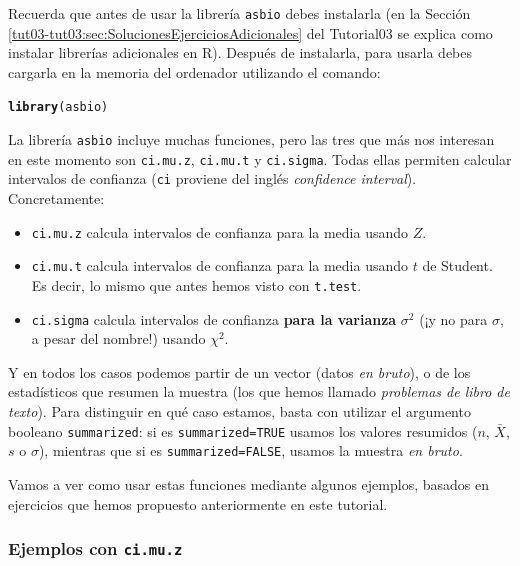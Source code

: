 \documentclass[10pt,a4paper]{article}\usepackage[]{graphicx}\usepackage[]{color}
\makeatletter
\newcommand{\hlstd}[1]{\textcolor[rgb]{0.345,0.345,0.345}{#1}}%
\newcommand{\hlkwd}[1]{\textcolor[rgb]{0.737,0.353,0.396}{\textbf{#1}}}%
\newenvironment{kframe}{%
 \def\at@end@of@kframe{}%
 \ifinner\ifhmode%
  \def\at@end@of@kframe{\end{minipage}}%
  \begin{minipage}{\columnwidth}%
 \fi\fi%
 \def\FrameCommand##1{\hskip\@totalleftmargin \hskip-\fboxsep
 \colorbox{shadecolor}{##1}\hskip-\fboxsep
     \hskip-\linewidth \hskip-\@totalleftmargin \hskip\columnwidth}%
 \MakeFramed {\advance\hsize-\width
   \@totalleftmargin\z@ \linewidth\hsize
   \@setminipage}}%
 {\par\unskip\endMakeFramed%
 \at@end@of@kframe}
\newenvironment{knitrout}{}{} %
\makeatother
\begin{document}
Recuerda que antes de usar la librería {\tt asbio} debes instalarla (en la Sección \ref{tut03-tut03:sec:SolucionesEjerciciosAdicionales} del Tutorial03 se explica como instalar librerías adicionales en R). Después de instalarla, para usarla debes cargarla en la memoria del ordenador  utilizando el comando:
\begin{knitrout}
\color{fgcolor}\begin{kframe}
\begin{alltt}
    \hlkwd{library}\hlstd{(asbio)}
\end{alltt}


{\ttfamily\noindent\itshape\color{messagecolor}{\#\# Loading required package: tcltk}}

{\ttfamily\noindent\bfseries\color{errorcolor}{\#\# Error: package 'tcltk' could not be loaded}}\end{kframe}
\end{knitrout}
La librería {\tt asbio} incluye muchas funciones, pero las tres que más nos interesan en este momento son
{\tt ci.mu.z},   {\tt ci.mu.t} y {\tt  ci.sigma}. Todas ellas permiten calcular intervalos de confianza ({\tt ci} proviene del inglés {\em confidence interval}). Concretamente:
\begin{itemize}
  \item {\tt ci.mu.z} calcula intervalos de confianza  para la media usando $Z$.
  \item {\tt ci.mu.t} calcula intervalos de confianza  para la media usando $t$ de Student. Es decir, lo mismo que antes hemos visto con {\tt t.test}.
  \item {\tt ci.sigma} calcula intervalos de confianza {\bf para la varianza} $\sigma^2$  (¡y no para $\sigma$, a pesar del nombre!) usando $\chi^2$.
\end{itemize}
Y en todos los casos podemos partir de un vector (datos {\em en bruto}), o de los estadísticos que resumen la muestra (los que hemos llamado {\em problemas de libro de texto}). Para distinguir en qué caso estamos, basta con utilizar el argumento booleano {\tt summarized}: si es {\tt summarized=TRUE} usamos los valores resumidos ($n$, $\bar X$, $s$ o $\sigma$), mientras que si es {\tt summarized=FALSE}, usamos la muestra {\em en bruto}.

Vamos a ver como usar estas funciones mediante algunos ejemplos, basados en ejercicios que hemos propuesto anteriormente en este tutorial.

\subsubsection*{Ejemplos con {\tt ci.mu.z}}
\end{document}
